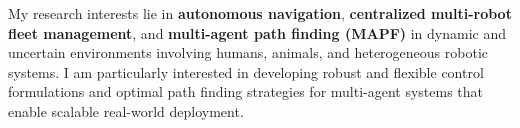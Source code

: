 My research interests lie in \textbf{autonomous navigation}, \textbf{centralized multi-robot fleet management}, and \textbf{multi-agent path finding (MAPF)} in dynamic and uncertain environments involving humans, animals, and heterogeneous robotic systems. I am particularly interested in developing robust and flexible control formulations and optimal path finding strategies for multi-agent systems that enable scalable real-world deployment.